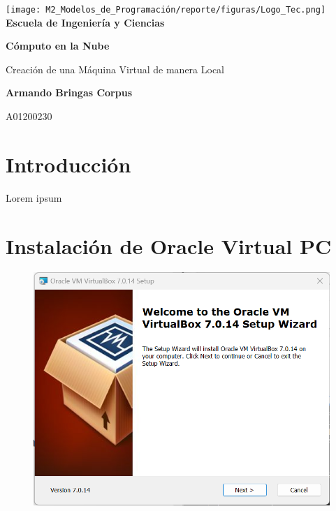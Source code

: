 \documentclass[12pt,a4paper]{article}
\begin{document}
\begin{titlepage}
    \centering
    \texttt{[image: M2\_Modelos\_de\_Programación/reporte/figuras/Logo\_Tec.png]}\\
    \vspace{.5cm}
    \bfseries\large Escuela de Ingeniería y Ciencias
        
    \vspace{5cm}
    \centering
    \textbf{\Huge Cómputo en la Nube}
    \vspace{0.5cm}
        
    {\Large Creación de una Máquina Virtual de manera Local}

    \vspace{5cm}
        
    \textbf{\LARGE Armando Bringas Corpus}
        
    \vspace{0.5cm}
        
    {\large A01200230}
        
    \vfill
        
\end{titlepage}

\section{Introducción}

Lorem ipsum

\section{Instalación de Oracle Virtual PC}

\begin{figure}[H]
    \centering
    \includegraphics[width=1\linewidth]{M3_Virtualización_y_Contenedores/Tarea_2_Máquina_Virtual_Local/reporte/figuras/2-1_Instalación_Oracle_VM.png}
    \label{fig:Instalación_VirtualBox_1}
\end{figure}
\end{document}
